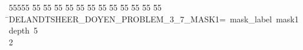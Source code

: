 %
%
\begin{tabbing}
55555 \= 55 \= 55 \= 55 \= 55 \= 55 \= 55 \= 55 \= 55 \= 55 \= 55 \= 55 \= 55 \= \>DELANDTSHEER\_DOYEN\_PROBLEM\_3\_7\_MASK1=\ mask\_label\ mask1\ depth\ 5\\[0pt]
2\>\end{tabbing}
